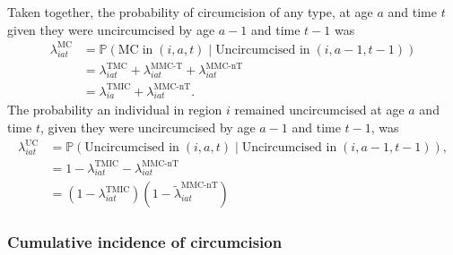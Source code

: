 \documentclass{article}
\begin{document}
\begin{appendix}
\noindent Taken together, the probability of circumcision of any type, at age $a$ and time $t$ given they were uncircumcised by age $a-1$ and time $t-1$ was 
\begin{equation}
	\begin{split}
	\lambda^{\text{MC}}_{iat} &= \mathbb{P}(\text{MC} \; \text{in} \; (i,a,t) \; | \; \text{Uncircumcised in} \; (i,a-1,t-1)) \\
	              &= \lambda^{\text{TMC}}_{iat} + \lambda^{\text{MMC-T}}_{iat} + \lambda^{\text{MMC-nT}}_{iat} \\ 
	              &= \lambda^{\text{TMIC}}_{ia} + \lambda^{\text{MMC-nT}}_{iat}. 
	\end{split}
	\label{eqn::tot}
\end{equation}
The probability an individual in region $i$ remained uncircumcised at age $a$ and time $t$, given they were uncircumcised by age $a-1$ and time $t-1$, was
\begin{equation}
	\begin{split}
		\lambda^{\text{UC}}_{iat} &= \mathbb{P}(\text{Uncircumcised in}  \; (i,a,t) \; | \; \text{Uncircumcised in} \; (i,a-1, t-1)),\\
		&= 1 - \lambda^{\text{TMIC}}_{iat} - \lambda^{\text{MMC-nT}}_{iat} \\
		&= (1 - \lambda^{\text{TMIC}}_{iat})(1 - \tilde{\lambda}^{\text{MMC-nT}}_{iat})
	\end{split}
	\label{eqn::uncirc}
\end{equation}


\subsubsection{Cumulative incidence of circumcision}



\end{appendix}
\end{document}
